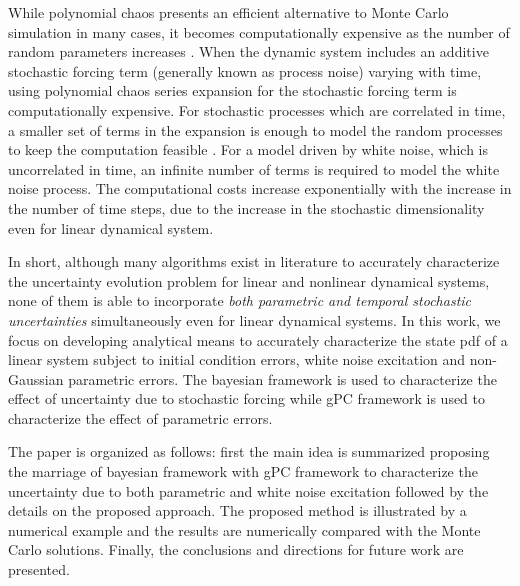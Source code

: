 \documentclass[10pt, conference]{IEEEtran}
\begin{document}
While polynomial chaos presents an efficient alternative to Monte Carlo simulation in many cases, it becomes computationally expensive as the number of random parameters increases \cite{augustin:08}. When the dynamic system includes an additive stochastic forcing term (generally known as process noise) varying with time, using polynomial chaos series expansion for the stochastic forcing term is computationally expensive. For stochastic processes which are correlated in time, a smaller set of terms in the expansion is enough to model the random processes to keep the computation feasible \cite{ghanem:91,sandu:06}. For a model driven by white noise, which is uncorrelated in time, an infinite number of terms is required to model the white noise process. The computational costs increase exponentially with the increase in the number of time steps, due to the increase in the stochastic dimensionality even for linear dynamical system.

In short, although many algorithms exist in literature to accurately characterize the uncertainty evolution problem for linear and nonlinear dynamical systems, none of them is able to incorporate \textit{both parametric and temporal stochastic uncertainties} simultaneously even for linear dynamical systems. In this work, we focus on developing analytical means to accurately characterize the state pdf of a linear system subject to initial condition errors, white noise excitation and non-Gaussian parametric errors. The bayesian framework is used to characterize the effect of uncertainty due to stochastic forcing while gPC framework is used to characterize the effect of parametric errors.

The paper is organized as follows: first the main idea is summarized proposing the marriage of bayesian framework with gPC framework to characterize the uncertainty due to both parametric and white noise excitation followed by the details on the proposed approach. The proposed method is illustrated by a numerical example and the results are numerically compared with the Monte Carlo solutions. Finally, the conclusions and directions for future work are presented.
\end{document}
